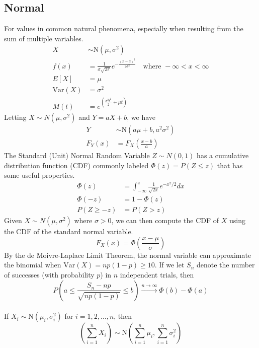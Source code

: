 \documentclass[12pt]{article}
\newcommand{\Sp}{\text{ }}
\newcommand{\Var}{\text{Var}}
\newcommand{\Norm}{\text{N}}
\newcommand{\Where}{\Sp\text{ where }}
\begin{document}
\subsection{Normal}
For values in common natural phenomena, especially when resulting from the sum of multiple variables.
\begin{align*}
    X& \sim \Norm(\mu, \sigma^2) \\
 f(x)& = \frac{1}{\sigma\sqrt{2\pi}} e^{-\frac{(x-\mu)^2}{2\sigma^2}} \Where -\infty < x < \infty \\
 E[X]& = \mu \\
    \Var(X)& = \sigma^2 \\
       M(t)& = e^{\left( \frac{\sigma^2 t^2}{2} + \mu t\right)}
\end{align*}
Letting $X \sim N(\mu, \sigma^2)$ and $Y = aX + b$, we have
\begin{align*}
    Y& \sim \Norm(a\mu + b, a^2\sigma^2) \\
     F_Y(x)& = F_X(\frac{x - b}{a})
\end{align*}
The Standard (Unit) Normal Random Variable $Z \sim N(0, 1)$ has a cumulative distribution function (CDF) commonly labeled $\Phi(z) = P(Z \leq z)$ that has some useful properties.
\begin{align*}
    \Phi(z)& = \int_{-\infty}^{z} \frac{1}{\sqrt{2\pi}} e^{-x^2/2} dx \\
   \Phi(-z)& = 1 - \Phi(z)\\
P(Z \geq -z)& = P(Z > z)
\end{align*}
Given $X \sim N(\mu, \sigma^2)$ where $\sigma > 0$, we can then compute the CDF of $X$ using the CDF of the standard normal variable.
$$F_X(x) = \Phi(\frac{x - \mu}{\sigma})$$
By the de Moivre-Laplace Limit Theorem, the normal variable can approximate the binomial when $\Var(X) = np(1-p) \geq 10$. If we let $S_n$ denote the number of successes (with probability $p$) in $n$ independent trials, then
$$ P \left( a \leq \frac{S_n - np}{\sqrt{np(1-p)}} \leq  b \right) \overset{n \rightarrow \infty}{\rightarrow} \Phi(b) - \Phi(a)$$
\\
If $X_i \sim \Norm(\mu_i, \sigma_i^2)$ for $i = 1, 2, \ldots, n$, then
\[
    \left( \sum_{i=1}^n X_i \right) \sim \Norm\left( \sum_{i=1}^n \mu_i, \sum_{i=1}^n \sigma_i^2 \right)
\]
\end{document}
